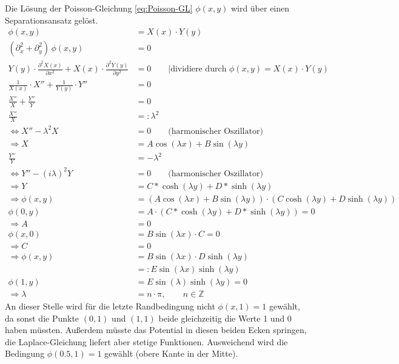 Die Lösung der Poisson-Gleichung \ref{eq:Poisson-GL} $\phi(x,y)$ wird über einen Separationsansatz gelöst.
\begin{align}
	\phi(x,y) &= X(x)\cdot Y(y)\\
	\left( \partial_x^2 + \partial_y^2 \right)\,\phi(x,y) &= 0 \\
	Y(y) \cdot \frac{\partial^2 X(x)}{\partial x^2} + X(x) \cdot \frac{\partial^2 Y(y)}{\partial y^2} &= 0 \qquad |\text{dividiere durch }\phi(x,y) = X(x)\cdot  Y(y)\\
	\frac{1}{X(x)} \cdot X'' + \frac{1}{Y(y)} \cdot Y'' &= 0 \\
	\frac{X''}{X} + \frac{Y''}{Y} &= 0 \\
	\frac{X''}{X} &=: \lambda^2 \\
    \Leftrightarrow X'' - \lambda^2 X &= 0 \qquad\text{(harmonischer Oszillator)} \\
    \Rightarrow X &= A\cos(\lambda x) + B\sin(\lambda y) \\
	\frac{Y''}{Y} &= -\lambda^2 \\
    \Leftrightarrow Y'' - (i\lambda)^2 Y &= 0 \qquad\text{(harmonischer Oszillator)} \\
    \Rightarrow Y &= C*\cosh(\lambda y) + D*\sinh(\lambda y) \\
    \Rightarrow \phi(x,y) &= \left(A\cos(\lambda x) + B\sin(\lambda y)\right)\cdot\left(C\cosh(\lambda y) + D\sinh(\lambda y)\right) \\
    \phi(0,y) &= A\cdot\left(C*\cosh(\lambda y) + D*\sinh(\lambda y)\right) = 0 \\
    \Rightarrow A &= 0 \\
    \phi(x,0) &= B\sin(\lambda x)\cdot C = 0 \\
    \Rightarrow C &= 0 \\
    \Rightarrow \phi(x,y) &= B\sin(\lambda x)\cdot D\sinh(\lambda y) \\
    &=: E\sin(\lambda x)\sinh(\lambda y) \\
    \phi(1,y) &= E\sin(\lambda)\sinh(\lambda y) = 0 \\
    \Rightarrow \lambda &= n\cdot\mathup{\pi}, \qquad n\in\mathbb{Z}
\end{align}
An dieser Stelle wird für die letzte Randbedingung nicht $\phi(x,1) = 1$ gewählt, da sonst die Punkte $(0,1)$ und $(1,1)$ beide gleichzeitig die Werte 1 und 0 haben müssten.
Außerdem müsste das Potential in diesen beiden Ecken springen, die Laplace-Gleichung liefert aber stetige Funktionen.
Ausweichend wird die Bedingung $\phi(0.5,1) = 1$ gewählt (obere Kante in der Mitte).
